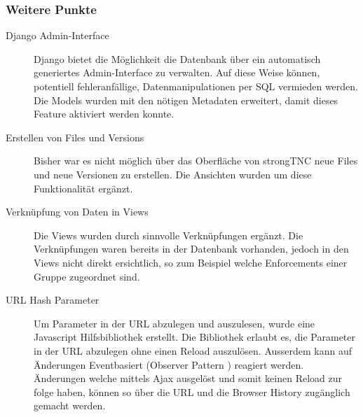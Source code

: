 \subsubsection{Weitere Punkte}
\begin{description}
\item[Django Admin-Interface] Django bietet die Möglichkeit die Datenbank über
ein automatisch generiertes Admin-Interface zu verwalten. Auf diese Weise
können, potentiell fehleranfällige, Datenmanipulationen per SQL vermieden
werden. Die Models wurden mit den nötigen Metadaten erweitert, damit dieses
Feature aktiviert werden konnte.

\item[Erstellen von Files und Versions] Bisher war es nicht möglich über das
Oberfläche von strongTNC neue Files und neue Versionen zu erstellen. Die
Ansichten wurden um diese Funktionalität ergänzt.

\item[Verknüpfung von Daten in Views] Die Views wurden durch sinnvolle
Verknüpfungen ergänzt. Die  Verknüpfungen waren bereits in der Datenbank
vorhanden, jedoch in den Views nicht direkt ersichtlich, so zum Beispiel welche
Enforcements einer Gruppe zugeordnet sind.

\item[URL Hash Parameter] Um Parameter in der URL abzulegen und auszulesen,
wurde eine Javascript Hilfsbibliothek erstellt. Die Bibliothek erlaubt es, die
Parameter in der URL abzulegen ohne einen Reload auszulösen. Ausserdem kann auf
Änderungen Eventbasiert (Observer Pattern \cite{gof94}) reagiert werden.
Änderungen welche mittels Ajax ausgelöst und somit keinen Reload zur folge
haben, können so über die URL und die Browser History zugänglich gemacht werden.
\end{description}




